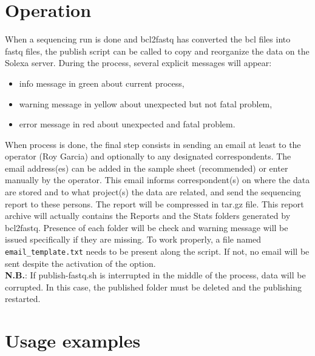 \documentclass[11pt]{report}
\begin{document}
 \section{Operation}

When a sequencing run is done and bcl2fastq has converted the bcl files into fastq files, the publish script can be called to copy and reorganize the data on the Solexa server. During the process, several explicit messages will appear:
\begin{itemize}
	\item info message in green about current process,
	\item warning message in yellow about unexpected but not fatal problem,
	\item error message in red about unexpected and fatal problem.
\end{itemize}

When process is done, the final step consists in sending an email at least to the operator (Roy Garcia) and optionally to any designated correspondents. The email address(es) can be added in the sample sheet (recommended) or enter manually by the operator. This email informs correspondent(s) on where the data are stored and to what project(s) the data are related, and send the sequencing report to these persons. The report will be compressed in tar.gz file. This report archive will actually contains the Reports and the Stats folders generated by bcl2fastq. Presence of each folder will be check and warning message will be issued specifically if they are missing. To work properly, a file named \verb|email_template.txt| needs to be present along the script. If not, no email will be sent despite the activation of the option.
~\\
\noindent \textbf{N.B.}: If publish-fastq.sh is interrupted in the middle of the process, data will be corrupted. In this case, the published folder must be deleted and the publishing restarted.


 \section{Usage examples}
\end{document}
